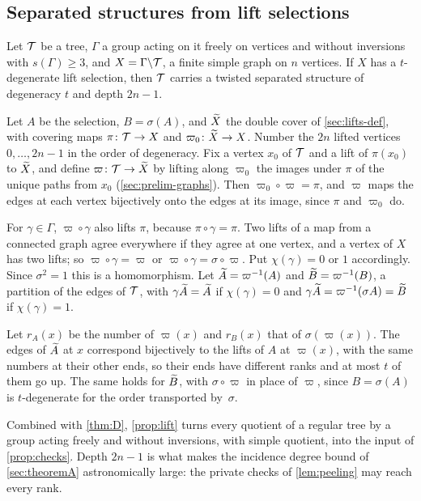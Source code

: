 \subsection{Separated structures from lift selections}\label{sec:peeling-lift}

\begin{proposition}\label{prop:lift}
\notformalized
Let $\mathcal{T}$ be a tree, $\Gamma$ a group acting on it freely on vertices and without inversions with $s(\Gamma)\ge3$, and
$X=\Gamma\backslash\mathcal{T}$, a finite simple graph on $n$ vertices. If $X$ has a $t$-degenerate lift selection, then
$\mathcal{T}$ carries a twisted separated structure of degeneracy $t$ and depth $2n-1$.
\end{proposition}
\begin{informalproof}
Let $A$ be the selection, $B=\sigma(A)$, and $\widetilde X$ the double cover of \cref{sec:lifts-def}, with covering maps
$\pi\colon\mathcal{T}\to X$ and $\varpi_0\colon\widetilde X\to X$. Number the $2n$ lifted vertices $0,\dots,2n-1$ in the order of
degeneracy. Fix a vertex $x_0$ of $\mathcal{T}$ and a lift of $\pi(x_0)$ to $\widetilde X$, and define $\varpi\colon\mathcal{T}\to\widetilde X$ by
lifting along $\varpi_0$ the images under $\pi$ of the unique paths from $x_0$ (\cref{sec:prelim-graphs}). Then
$\varpi_0\circ\varpi=\pi$, and $\varpi$ maps the edges at each vertex bijectively onto the edges at its image, since
$\pi$ and $\varpi_0$ do.

For $\gamma\in\Gamma$, $\varpi\circ\gamma$ also lifts $\pi$, because $\pi\circ\gamma=\pi$. Two lifts of a map from a
connected graph agree everywhere if they agree at one vertex, and a vertex of $X$ has two lifts; so
$\varpi\circ\gamma=\varpi$ or $\varpi\circ\gamma=\sigma\circ\varpi$. Put $\chi(\gamma)=0$ or $1$ accordingly. Since
$\sigma^2=1$ this is a homomorphism. Let $\widetilde A=\varpi^{-1}(A)$ and $\widetilde B=\varpi^{-1}(B)$, a partition of the edges
of $\mathcal{T}$, with $\gamma\widetilde A=\widetilde A$ if $\chi(\gamma)=0$ and $\gamma\widetilde A=\varpi^{-1}(\sigma A)=\widetilde B$ if
$\chi(\gamma)=1$.

Let $r_A(x)$ be the number of $\varpi(x)$ and $r_B(x)$ that of $\sigma(\varpi(x))$. The edges of $\widetilde A$ at $x$
correspond bijectively to the lifts of $A$ at $\varpi(x)$, with the same numbers at their other ends, so their ends have
different ranks and at most $t$ of them go up. The same holds for $\widetilde B$, with $\sigma\circ\varpi$ in place of
$\varpi$, since $B=\sigma(A)$ is $t$-degenerate for the order transported by~$\sigma$.
\end{informalproof}

Combined with \cref{thm:D}, \cref{prop:lift} turns every quotient of a regular tree by a group acting freely and
without inversions, with simple quotient, into the input of \cref{prop:checks}. Depth $2n-1$ is what makes the incidence degree bound of
\cref{sec:theoremA} astronomically large: the private checks of \cref{lem:peeling} may reach every rank.
